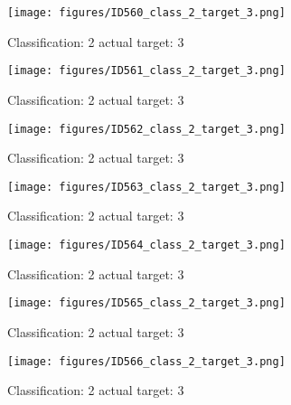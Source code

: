 \begin{figure}[h!]
\begin{center}
\texttt{[image: figures/ID560\_class\_2\_target\_3.png]}
\end{center}
\caption{ Classification: 2 actual target: 3}
\label{fig:ID560_class_2_target_3}
\end{figure}
\begin{figure}[h!]
\begin{center}
\texttt{[image: figures/ID561\_class\_2\_target\_3.png]}
\end{center}
\caption{ Classification: 2 actual target: 3}
\label{fig:ID561_class_2_target_3}
\end{figure}
\begin{figure}[h!]
\begin{center}
\texttt{[image: figures/ID562\_class\_2\_target\_3.png]}
\end{center}
\caption{ Classification: 2 actual target: 3}
\label{fig:ID562_class_2_target_3}
\end{figure}
\begin{figure}[h!]
\begin{center}
\texttt{[image: figures/ID563\_class\_2\_target\_3.png]}
\end{center}
\caption{ Classification: 2 actual target: 3}
\label{fig:ID563_class_2_target_3}
\end{figure}
\begin{figure}[h!]
\begin{center}
\texttt{[image: figures/ID564\_class\_2\_target\_3.png]}
\end{center}
\caption{ Classification: 2 actual target: 3}
\label{fig:ID564_class_2_target_3}
\end{figure}
\begin{figure}[h!]
\begin{center}
\texttt{[image: figures/ID565\_class\_2\_target\_3.png]}
\end{center}
\caption{ Classification: 2 actual target: 3}
\label{fig:ID565_class_2_target_3}
\end{figure}
\begin{figure}[h!]
\begin{center}
\texttt{[image: figures/ID566\_class\_2\_target\_3.png]}
\end{center}
\caption{ Classification: 2 actual target: 3}
\label{fig:ID566_class_2_target_3}
\end{figure}
